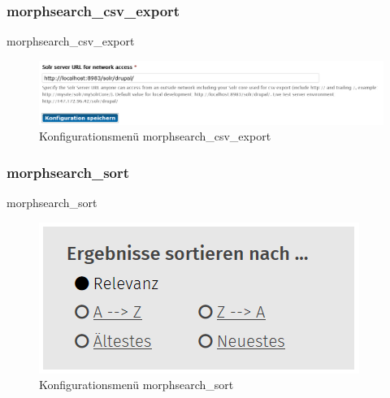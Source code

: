\subsubsection{morphsearch\_csv\_export}\label{subsub:morphsearchcsv}
morphsearch\_csv\_export
\begin{figure}[H]
	\centering
	\includegraphics[width=0.70\linewidth]{images/config_searchcsv}
	\caption[]{Konfigurationsmenü morphsearch\_csv\_export}
	\label{fig:config_search}
\end{figure}



\subsubsection{morphsearch\_sort}\label{subsub:morphsearchsort}
morphsearch\_sort
\begin{figure}[H]
	\centering
	\includegraphics[height=0.10\textheight]{images/example_morphsearchsort}
	\caption[]{Konfigurationsmenü morphsearch\_sort}
	\label{fig:morphsearchsort}
\end{figure}


